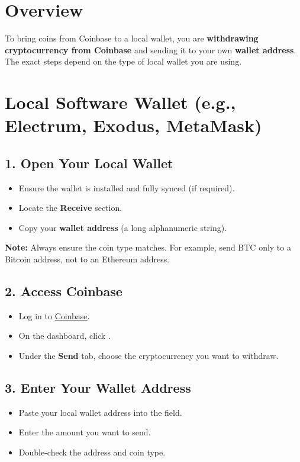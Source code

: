 \documentclass{article}
\begin{document}
\section*{Overview}
To bring coins from Coinbase to a local wallet, you are \textbf{withdrawing cryptocurrency from Coinbase} and sending it to your own \textbf{wallet address}. The exact steps depend on the type of local wallet you are using.

\section{Local Software Wallet (e.g., Electrum, Exodus, MetaMask)}
\subsection*{1. Open Your Local Wallet}
\begin{itemize}
    \item Ensure the wallet is installed and fully synced (if required).
    \item Locate the \textbf{Receive} section.
    \item Copy your \textbf{wallet address} (a long alphanumeric string).
\end{itemize}
\textbf{Note:} Always ensure the coin type matches. For example, send BTC only to a Bitcoin address, not to an Ethereum address.

\subsection*{2. Access Coinbase}
\begin{itemize}
    \item Log in to \href{https://www.coinbase.com}{Coinbase}.
    \item On the dashboard, click \textbf{}.
    \item Under the \textbf{Send} tab, choose the cryptocurrency you want to withdraw.
\end{itemize}

\subsection*{3. Enter Your Wallet Address}
\begin{itemize}
    \item Paste your local wallet address into the  field.
    \item Enter the amount you want to send.
    \item Double-check the address and coin type.
\end{itemize}
\end{document}
